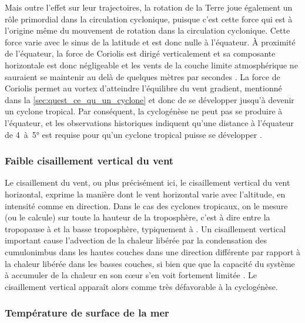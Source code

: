 \documentclass[../main.tex]{subfiles}
\begin{document}
Mais outre l'effet sur leur trajectoires, la rotation de la Terre joue également un rôle primordial dans la circulation cyclonique, puisque c'est cette force
qui est à l'origine même du mouvement de rotation dans la circulation cyclonique. Cette force varie avec le sinus de la latitude et est donc nulle à l'équateur.
À proximité de l'équateur, la force de Coriolis est dirigé verticalement  et sa composante horizontale est donc négligeable et les vents de la couche limite
atmosphérique ne sauraient se maintenir au delà de quelques mètres par secondes \parencite{gray_tropical_1975}. La force de Coriolis permet au vortex
d'atteindre l'équilibre du vent gradient, mentionné dans la \cref{sec:quest_ce_qu_un_cyclone} et donc de se développer jusqu'à devenir un cyclone tropical. Par
conséquent, la cyclogénèse ne peut pas se produire à l'équateur, et les observations historiques indiquent qu'une distance à l'équateur de \num{4}~à~\ang{5} est
requise pour qu'un cyclone tropical puisse se développer \parencite{gray_global_1968}.

\subsubsection*{Faible cisaillement vertical du vent}

Le cisaillement du vent, ou plus précisément ici, le cisaillement vertical du vent horizontal, exprime la manière dont le vent horizontal varie avec l'altitude,
en intensité comme en direction. Dans le cas des cyclones tropicaux, on le mesure (ou le calcule) sur toute la hauteur de la troposphère, c'est à dire entre la
tropopause à  et la basse troposphère, typiquement à . Un cisaillement vertical important cause l'advection de la chaleur libérée par la
condensation des cumulonimbus dans les hautes couches dans une direction différente par rapport à la chaleur libérée dans les basses couches, si bien que que la
capacité du système à accumuler de la chaleur en son cœur s'en voit fortement limitée \parencite{gray_global_1968}.  Le cisaillement vertical apparaît alors
comme très défavorable à la cyclogénèse.

\subsubsection*{Température de surface de la mer}
\end{document}
